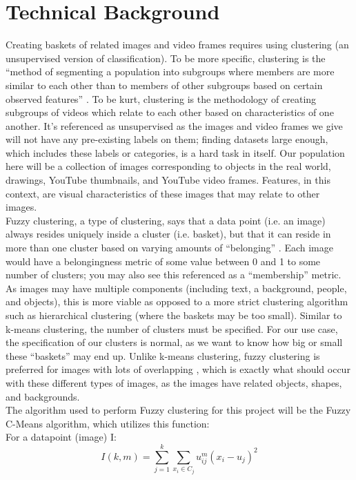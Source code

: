 \documentclass[10pt,twocolumn]{article}
\begin{document}
\section{Technical Background} 

Creating baskets of related images and video frames requires using clustering (an unsupervised version of classification). To be more specific, clustering is the “method of segmenting a population into subgroups where members are more similar to each other than to members of other subgroups based on certain observed features” \cite{C3Clustering}. To be kurt, clustering is the methodology of creating subgroups of videos which relate to each other based on characteristics of one another. It’s referenced as unsupervised as the images and video frames we give will not have any pre-existing labels on them; finding datasets large enough, which includes these labels or categories, is a hard task in itself. Our population here will be a collection of images corresponding to objects in the real world, drawings, YouTube thumbnails, and YouTube video frames. Features, in this context, are visual characteristics of these images that may relate to other images. \\
\indent Fuzzy clustering, a type of clustering, says that a data point (i.e. an image) always resides uniquely inside a cluster (i.e. basket), but that it can reside in more than one cluster based on varying amounts of “belonging” \cite{PrasadClustering}. Each image would have a belongingness metric of some value between 0 and 1 to some number of clusters; you may also see this referenced as a “membership” metric. As images may have multiple components (including text, a background, people, and objects), this is more viable as opposed to a more strict clustering algorithm such as hierarchical clustering (where the baskets may be too small). Similar to k-means clustering, the number of clusters must be specified. For our use case, the specification of our clusters is normal, as we want to know how big or small these “baskets” may end up. Unlike k-means clustering, fuzzy clustering is preferred for images with lots of overlapping \cite{PrasadClustering}, which is exactly what should occur with these different types of images, as the images have related objects, shapes, and backgrounds. \\
\indent The algorithm used to perform Fuzzy clustering for this project will be the Fuzzy C-Means algorithm, which utilizes this function: \\
For a datapoint (image) I:
\[ I(k, m)  =  \sum_{j=1}^{k} \sum_{x_i \in C_j} u_{ij}^{m}(x_i - u_j)^2 \]
\end{document}
